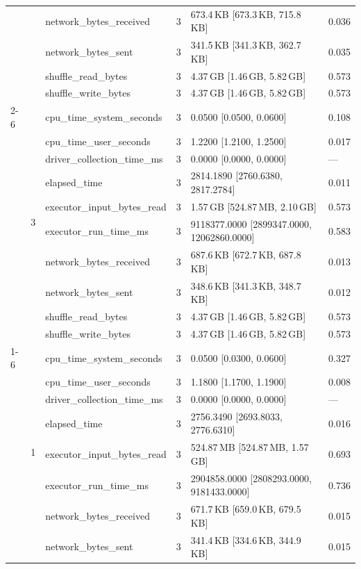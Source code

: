 \begin{tabular}{lllrll}
 &  & network_bytes_received & 3 & 673.4\,KB [673.3\,KB, 715.8\,KB] & 0.036 \\
 &  & network_bytes_sent & 3 & 341.5\,KB [341.3\,KB, 362.7\,KB] & 0.035 \\
 &  & shuffle_read_bytes & 3 & 4.37\,GB [1.46\,GB, 5.82\,GB] & 0.573 \\
 &  & shuffle_write_bytes & 3 & 4.37\,GB [1.46\,GB, 5.82\,GB] & 0.573 \\
\cline{2-6}
 & \multirow[t]{10}{*}{3} & cpu_time_system_seconds & 3 & 0.0500 [0.0500, 0.0600] & 0.108 \\
 &  & cpu_time_user_seconds & 3 & 1.2200 [1.2100, 1.2500] & 0.017 \\
 &  & driver_collection_time_ms & 3 & 0.0000 [0.0000, 0.0000] & --- \\
 &  & elapsed_time & 3 & 2814.1890 [2760.6380, 2817.2784] & 0.011 \\
 &  & executor_input_bytes_read & 3 & 1.57\,GB [524.87\,MB, 2.10\,GB] & 0.573 \\
 &  & executor_run_time_ms & 3 & 9118377.0000 [2899347.0000, 12062860.0000] & 0.583 \\
 &  & network_bytes_received & 3 & 687.6\,KB [672.7\,KB, 687.8\,KB] & 0.013 \\
 &  & network_bytes_sent & 3 & 348.6\,KB [341.3\,KB, 348.7\,KB] & 0.012 \\
 &  & shuffle_read_bytes & 3 & 4.37\,GB [1.46\,GB, 5.82\,GB] & 0.573 \\
 &  & shuffle_write_bytes & 3 & 4.37\,GB [1.46\,GB, 5.82\,GB] & 0.573 \\
\cline{1-6} \cline{2-6}
\multirow[t]{30}{*}{national-scale-spatial-join-databricks-partitioned-16-nodes-small} & \multirow[t]{10}{*}{1} & cpu_time_system_seconds & 3 & 0.0500 [0.0300, 0.0600] & 0.327 \\
 &  & cpu_time_user_seconds & 3 & 1.1800 [1.1700, 1.1900] & 0.008 \\
 &  & driver_collection_time_ms & 3 & 0.0000 [0.0000, 0.0000] & --- \\
 &  & elapsed_time & 3 & 2756.3490 [2693.8033, 2776.6310] & 0.016 \\
 &  & executor_input_bytes_read & 3 & 524.87\,MB [524.87\,MB, 1.57\,GB] & 0.693 \\
 &  & executor_run_time_ms & 3 & 2904858.0000 [2808293.0000, 9181433.0000] & 0.736 \\
 &  & network_bytes_received & 3 & 671.7\,KB [659.0\,KB, 679.5\,KB] & 0.015 \\
 &  & network_bytes_sent & 3 & 341.4\,KB [334.6\,KB, 344.9\,KB] & 0.015 \\

\end{tabular}
